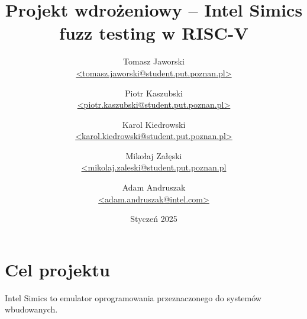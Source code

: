 \documentclass[14pt]{article}
\title{Projekt wdrożeniowy -- Intel Simics fuzz testing w RISC-V}
\author{
	Tomasz Jaworski\\ \href{mailto:tomasz.jaworski@student.put.poznan.pl}{\small <tomasz.jaworski@student.put.poznan.pl>}
	\and Piotr Kaszubski\\ \href{mailto:piotr.kaszubski@student.put.poznan.pl}{\small <piotr.kaszubski@student.put.poznan.pl>}
	\and Karol Kiedrowski\\ \href{mailto:karol.kiedrowski@student.put.poznan.pl}{\small <karol.kiedrowski@student.put.poznan.pl>}
	\and Mikołaj Załęski\\ \href{mailto:mikolaj.zaleski@student.put.poznan.pl}{\small <mikolaj.zaleski@student.put.poznan.pl}
	\and Adam Andruszak\\ \href{mailto:adam.andruszak@intel.com}{\small <adam.andruszak@intel.com>}
}
\date{Styczeń 2025}
\begin{document}
\maketitle
\tableofcontents
\section{Cel projektu}
Intel Simics to emulator oprogramowania przeznaczonego do systemów wbudowanych.
\end{document}
